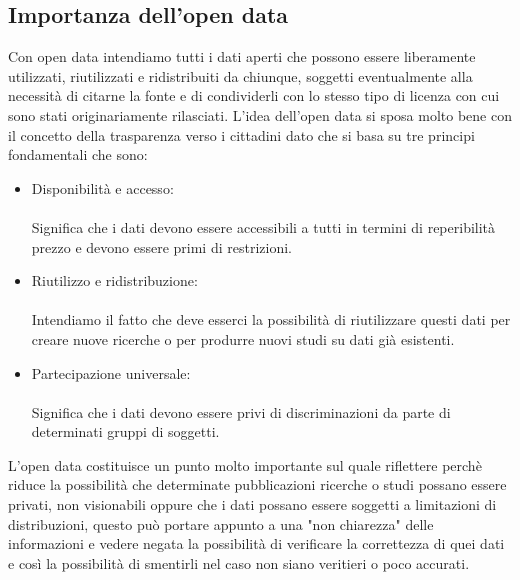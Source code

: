 \documentclass{article}
\begin{document}
\subsection{Importanza dell'open data}
Con open data \cite{murray2008open} intendiamo tutti i dati aperti che possono essere liberamente utilizzati, riutilizzati e ridistribuiti da chiunque, soggetti eventualmente alla necessità di citarne la fonte e di condividerli con lo stesso tipo di licenza con cui sono stati originariamente rilasciati.
L'idea dell'open data si sposa molto bene con il concetto della trasparenza verso i cittadini dato che si basa su tre principi fondamentali che sono:
\begin{itemize}
    \item Disponibilità e accesso:\\
    \\
    Significa che i dati devono essere accessibili a tutti in termini di reperibilità prezzo e devono essere primi di restrizioni.
    \item Riutilizzo e ridistribuzione: \\
    \\
    Intendiamo il fatto che deve esserci la possibilità di riutilizzare questi dati per creare nuove ricerche o per produrre nuovi studi su dati già esistenti.
    \item Partecipazione universale: \\
    \\
    Significa che i dati devono essere privi di discriminazioni da parte di determinati gruppi di soggetti.
\end{itemize}
L'open data costituisce un punto molto importante sul quale riflettere perchè riduce la possibilità che determinate pubblicazioni ricerche o studi possano essere privati, non visionabili oppure che i dati possano essere soggetti a limitazioni di distribuzioni, questo può portare appunto a una "non chiarezza" delle informazioni e vedere negata la possibilità di verificare la correttezza di quei dati e così la possibilità di smentirli nel caso non siano veritieri o poco accurati.  
\end{document}
